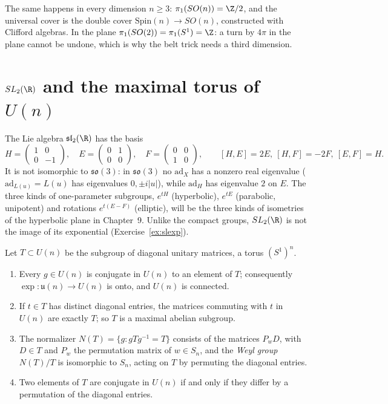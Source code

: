 \begin{remark}
The same happens in every dimension $n\ge3$: $\pi_1(SO(n))=\Z/2$, and the universal cover is the double cover $\mathrm{Spin}(n)\to SO(n)$, constructed with Clifford algebras. In the plane
$\pi_1(SO(2))=\pi_1(S^1)=\Z$: a turn by $4\pi$ in the plane cannot be undone, which is why the belt trick needs a third dimension.
\end{remark}

\section{$SL_2(\R)$ and the maximal torus of $U(n)$}

The Lie algebra $\mathfrak{sl}_2(\R)$ has the basis
\[H=\begin{pmatrix}1&0\\0&-1\end{pmatrix},\quad E=\begin{pmatrix}0&1\\0&0\end{pmatrix},\quad F=\begin{pmatrix}0&0\\1&0\end{pmatrix},\qquad[H,E]=2E,\ [H,F]=-2F,\ [E,F]=H.\]
It is not isomorphic to $\mathfrak{so}(3)$: in $\mathfrak{so}(3)$ no $\mathrm{ad}_X$ has a nonzero real eigenvalue ($\mathrm{ad}_{L(u)}=L(u)$ has eigenvalues $0,\pm i|u|$), while $\mathrm{ad}_H$ has eigenvalue $2$ on $E$. The three kinds of
one-parameter subgroups, $e^{tH}$ (hyperbolic), $e^{tE}$ (parabolic, unipotent) and rotations $e^{t(E-F)}$ (elliptic), will be the three kinds of isometries of the hyperbolic plane in Chapter~9. Unlike the compact
groups, $SL_2(\R)$ is not the image of its exponential (Exercise~\ref{ex:slexp}).

\begin{theorem}\label{thm:torus}
Let $T\subset U(n)$ be the subgroup of diagonal unitary matrices, a torus $(S^1)^n$.
\begin{enumerate}
\item[(a)] Every $g\in U(n)$ is conjugate in $U(n)$ to an element of $T$; consequently $\exp\colon\mathfrak u(n)\to U(n)$ is onto, and $U(n)$ is connected.
\item[(b)] If $t\in T$ has distinct diagonal entries, the matrices commuting with $t$ in $U(n)$ are exactly $T$; so $T$ is a maximal abelian subgroup.
\item[(c)] The normalizer $N(T)=\{g:gTg^{-1}=T\}$ consists of the matrices $P_wD$, with $D\in T$ and $P_w$ the permutation matrix of $w\in S_n$, and the \emph{Weyl group} $N(T)/T$ is isomorphic to $S_n$, acting on $T$ by
permuting the diagonal entries.
\item[(d)] Two elements of $T$ are conjugate in $U(n)$ if and only if they differ by a permutation of the diagonal entries.
\end{enumerate}
\end{theorem}

